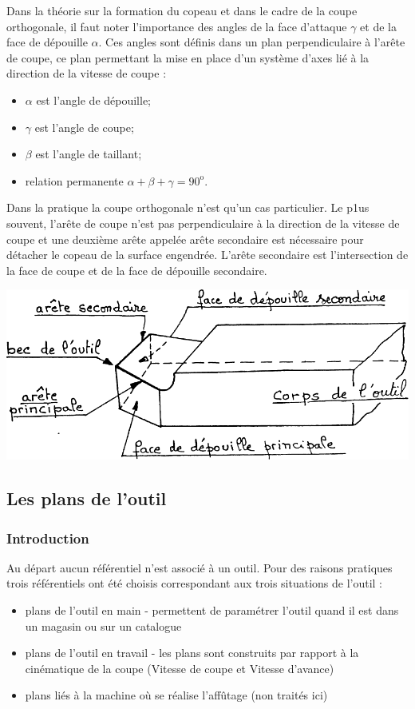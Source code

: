 \documentclass[11pt,oneside]{article}
\begin{document}
Dans la théorie sur la formation du copeau et dans le cadre de la coupe orthogonale, il faut noter l'importance des angles de la face d'attaque $\gamma$ et de la face de dépouille $\alpha$. Ces angles sont définis dans un plan perpendiculaire à l'arête de coupe, ce plan permettant la mise en place d'un système d'axes lié à la direction de la vitesse de coupe :
\begin{itemize}
\item $\alpha$ est l'angle de dépouille;
\item $\gamma$ est l'angle de coupe;
\item $\beta$ est l'angle de taillant;
\item relation permanente $\alpha + \beta + \gamma = 90^\text{o}$.
\end{itemize}
	



Dans la pratique la coupe orthogonale n'est qu'un cas particulier. Le p1us souvent, l'arête de coupe n'est pas perpendiculaire à la direction de la vitesse de coupe et une deuxième arête appelée arête secondaire est nécessaire pour détacher le copeau de la surface engendrée. L'arête secondaire est l'intersection de la face de coupe et de la face de dépouille secondaire. 

\begin{center}
\includegraphics[width=.75\textwidth]{png/fig_12}
\end{center}

\subsection{Les plans de l'outil}
\subsubsection{Introduction}
Au départ aucun référentiel n'est associé à un outil. Pour des raisons pratiques trois référentiels ont été choisis correspondant aux trois situations de l'outil :
\begin{itemize}
\item plans de l'outil en main - permettent de paramétrer l'outil quand il est dans un magasin ou sur un catalogue
\item plans de l'outil en travail - les plans sont construits par rapport à la cinématique de la coupe (Vitesse de coupe et Vitesse d'avance)
\item plans liés à la machine où se réalise l'affûtage (non traités ici)
\end{itemize}
\end{document}
